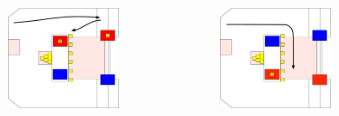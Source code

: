 \documentclass{beamer}
\begin{document}
\begin{frame}
\begin{columns}
\begin{figure}
  \end{figure}
  \begin{figure}
   \includegraphics[scale=0.15]{assets/paths/11_LL}
  \end{figure}
  \begin{figure}
   \includegraphics[scale=0.15]{assets/paths/11_RR}
  \end{figure}
 \end{columns}
\end{frame}
\end{document}
